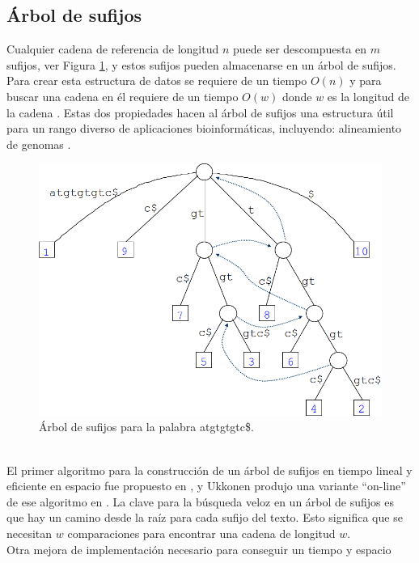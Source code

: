 \documentclass[11pt,a4paper,english]{article}
\begin{document}
\subsection{Árbol de sufijos}
\indent
 Cualquier cadena de referencia de longitud $n$ puede ser descompuesta en $m$ sufijos, ver
 Figura \ref{fig:st}, y estos sufijos pueden almacenarse en un árbol de sufijos.
 Para crear esta estructura de datos se requiere de un tiempo $O(n)$ y para
 buscar una cadena en él requiere de un tiempo $O(w)$ donde $w$ es la longitud
 de la cadena \cite{Gusfield2007Algorithms}. Estas dos propiedades hacen al árbol
 de sufijos una estructura útil para un rango diverso de aplicaciones
 bioinformáticas, incluyendo: alineamiento de genomas \cite{Mummer1,
 mummer2,Mummer3}.\\
 \begin{figure}[h]
   \centering 
   \includegraphics[scale=0.3]{st.png} 
   \caption{Árbol de sufijos para la palabra atgtgtgtc\$.} 
   \label{fig:st} 
 \end{figure}
\\ \indent
El primer algoritmo para la construcción de un árbol de sufijos en tiempo lineal 
y eficiente en espacio fue propuesto en \cite{McCreight:1976:SST:321941.321946}
, y Ukkonen produjo una variante ``on-line'' de ese algoritmo en \cite{Ukkonen1992}. 
La clave para la búsqueda veloz en un árbol de sufijos es que 
hay un camino desde la raíz para cada sufijo del texto. Esto significa que se 
necesitan $w$ comparaciones para encontrar una cadena de longitud $w$.\\
\indent
Otra mejora de implementación necesario para conseguir un tiempo y espacio 
\end{document}
